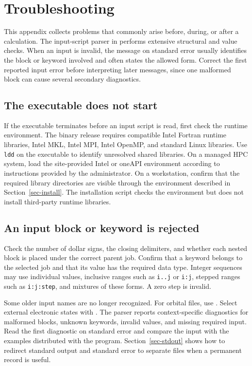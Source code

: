 \chapter{Troubleshooting}\label{app-troubleshooting}
This appendix collects problems that commonly arise before, during, or after a calculation. The input-script parser in \progname{} performs extensive structural and value checks. When an input is invalid, the message on standard error usually identifies the block or keyword involved and often states the allowed form. Correct the first reported input error before interpreting later messages, since one malformed block can cause several secondary diagnostics.

\section{The executable does not start}
If the executable terminates before an input script is read, first check the runtime environment. The binary release requires compatible Intel Fortran runtime libraries, Intel MKL, Intel MPI, Intel OpenMP, and standard Linux libraries. Use \texttt{ldd} on the executable to identify unresolved shared libraries. On a managed HPC system, load the site-provided Intel or oneAPI environment according to instructions provided by the administrator. On a workstation, confirm that the required library directories are visible through the environment described in Section~\ref{sec-install}. The installation script checks the environment but does not install third-party runtime libraries.

\section{An input block or keyword is rejected}
Check the number of dollar signs, the closing delimiters, and whether each nested block is placed under the correct parent job. Confirm that a keyword belongs to the selected job and that its value has the required data type. Integer sequences may use individual values, inclusive ranges such as \texttt{i..j} or \texttt{i:j}, stepped ranges such as \texttt{i:j:step}, and mixtures of these forms. A zero step is invalid.

Some older input names are no longer recognized. For orbital files, use . Select external electronic states with . The parser reports context-specific diagnostics for malformed blocks, unknown keywords, invalid values, and missing required input. Read the first diagnostic on standard error and compare the input with the examples distributed with the program. Section~\ref{sec-stdout} shows how to redirect standard output and standard error to separate files when a permanent record is useful.

